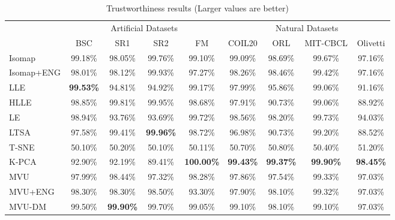         \begin{table}[t]
        \caption{Trustworthiness results (Larger values are better)}
        \label{tab:trustworthiness}
        \begin{center}
        \begin{tabular}{|l|c|c|c|c||c|c|c|c|}
        \hline
        \multicolumn{1}{|c|}{} & \multicolumn{4}{c||}{Artificial Datasets} & \multicolumn{4}{c|}{Natural Datasets} \\
                            & BSC & SR1 & SR2 & FM & COIL20 & ORL & MIT-CBCL & Olivetti \\
        \hline
        Isomap            & 99.18\% & 98.05\% & 99.76\% & 99.10\% & 99.09\% & 98.69\% & 99.67\% & 97.16\% \\
        Isomap+ENG            & 98.01\% & 98.12\% & 99.93\% & 97.27\% & 98.26\% & 98.46\% & 99.42\% & 97.16\% \\
        LLE            & \textbf{99.53\%} & 94.81\% & 94.92\% & 99.17\% & 97.99\% & 95.86\% & 99.06\% & 91.16\% \\
        HLLE            & 98.85\% & 99.81\% & 99.95\% & 98.68\% & 97.91\% & 90.73\% & 99.06\% & 88.92\% \\
        LE            & 98.94\% & 93.76\% & 93.69\% & 99.72\% & 98.56\% & 98.20\% & 99.73\% & 94.03\% \\
        LTSA            & 97.58\% & 99.41\% & \textbf{99.96\%} & 98.72\% & 96.98\% & 90.73\% & 99.20\% & 88.52\% \\
        T-SNE            & 50.10\% & 50.20\% & 50.10\% & 50.11\% & 50.70\% & 50.80\% & 50.40\% & 51.20\% \\
        K-PCA            & 92.90\% & 92.19\% & 89.41\% & \textbf{100.00\%} & \textbf{99.43\%} & \textbf{99.37\%} & \textbf{99.90\%} & \textbf{98.45\%} \\
        \hline
        MVU            & 97.99\% & 98.44\% & 97.32\% & 98.28\% & 97.86\% & 97.54\% & 99.33\% & 97.03\% \\
        MVU+ENG            & 98.30\% & 98.30\% & 98.50\% & 93.30\% & 97.90\% & 98.10\% & 99.32\% & 97.03\% \\
        MVU-DM            & 99.50\% & \textbf{99.90\%} & 99.70\% & 99.05\% & 99.10\% & 98.10\% & 99.10\% & 97.03\% \\
        \hline
        \end{tabular}
        \end{center}
        \end{table}

